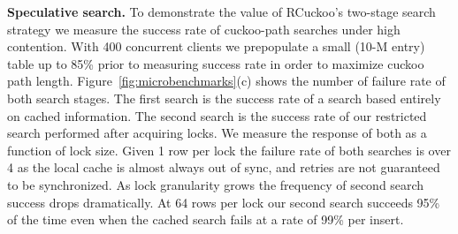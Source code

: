 




\textbf{Speculative search.}
To demonstrate the
value of RCuckoo's two-stage search strategy we measure
the success rate of cuckoo-path searches under high contention. With
400 concurrent clients we prepopulate a small (10-M entry) table
up to 85\% prior to measuring success rate in order to
maximize cuckoo path length. Figure~\ref{fig:microbenchmarks}(c)
shows the number of failure rate of both search stages. The first
search is the success rate of a search based entirely on
cached information. The second search is the success rate of
our restricted search performed after acquiring locks. We
measure the response of both as a function of lock size.
Given 1 row per lock the failure rate of both searches is
over 4 as the local cache is almost always out of sync, and
retries are not guaranteed to be synchronized. As lock
granularity grows the frequency of second search success
drops dramatically. At 64 rows per lock our second search
succeeds 95\% of the time even when the cached search fails
at a rate of 99\% per insert.


